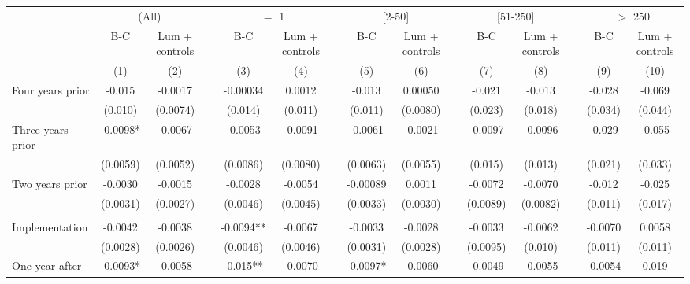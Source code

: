 \begin{tabular}{lcccccccccccccc}
\toprule
      & \multicolumn{2}{c}{(All)} &       & \multicolumn{2}{c}{$=$ 1} &       & \multicolumn{2}{c}{[2-50]} &       & \multicolumn{2}{c}{[51-250]} &       & \multicolumn{2}{c}{$>$ 250} \\
\cmidrule{2-3}\cmidrule{5-6}\cmidrule{8-9}\cmidrule{11-12}\cmidrule{14-15}      & B-C   & Lum + controls &       & B-C   & Lum + controls &       & B-C   & Lum + controls &       & B-C   & Lum + controls &       & B-C   & Lum + controls \\
\midrule
      & (1)   & (2)   &       & (3)   & (4)   &       & (5)   & (6)   &       & (7)   & (8)   &       & (9)   & (10) \\
\midrule
\midrule
Four years prior & -0.015 & -0.0017 &       & -0.00034 & 0.0012 &       & -0.013 & 0.00050 &       & -0.021 & -0.013 &       & -0.028 & -0.069 \\
      & (0.010) & (0.0074) &       & (0.014) & (0.011) &       & (0.011) & (0.0080) &       & (0.023) & (0.018) &       & (0.034) & (0.044) \\
Three years prior & -0.0098* & -0.0067 &       & -0.0053 & -0.0091 &       & -0.0061 & -0.0021 &       & -0.0097 & -0.0096 &       & -0.029 & -0.055 \\
      & (0.0059) & (0.0052) &       & (0.0086) & (0.0080) &       & (0.0063) & (0.0055) &       & (0.015) & (0.013) &       & (0.021) & (0.033) \\
Two years prior & -0.0030 & -0.0015 &       & -0.0028 & -0.0054 &       & -0.00089 & 0.0011 &       & -0.0072 & -0.0070 &       & -0.012 & -0.025 \\
      & (0.0031) & (0.0027) &       & (0.0046) & (0.0045) &       & (0.0033) & (0.0030) &       & (0.0089) & (0.0082) &       & (0.011) & (0.017) \\
      &       &       &       &       &       &       &       &       &       &       &       &       &       &  \\
Implementation & -0.0042 & -0.0038 &       & -0.0094** & -0.0067 &       & -0.0033 & -0.0028 &       & -0.0033 & -0.0062 &       & -0.0070 & 0.0058 \\
      & (0.0028) & (0.0026) &       & (0.0046) & (0.0046) &       & (0.0031) & (0.0028) &       & (0.0095) & (0.010) &       & (0.011) & (0.011) \\
One year after & -0.0093* & -0.0058 &       & -0.015** & -0.0070 &       & -0.0097* & -0.0060 &       & -0.0049 & -0.0055 &       & -0.0054 & 0.019 \\

\end{tabular}
